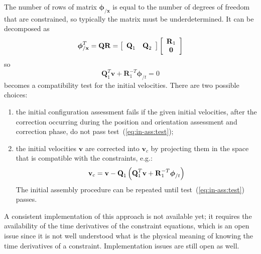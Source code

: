 \documentclass[10pt,dvips,fleqn,subeqn]{report}
\newcommand{\T}[1]{\bm{\mathbf{#1}}}
\begin{document}
The number of rows of matrix $\T{\phi}_{/\T{x}}$ is equal to the number 
of degrees of freedom that are constrained, so typically the matrix 
must be underdetermined.
It can be decomposed as
\begin{equation}
	\T{\phi}_{/\T{x}}^T = \T{Q} \T{R}
		= \sqbr{\matr{cc}{\T{Q}_1 & \T{Q}_2}}\sqbr{\cvvect{\T{R}_1 \\ \T{0}}}
\end{equation}
so
\begin{equation}
	\T{Q}_1^T \T{v} + \T{R}_1^{-T} \T{\phi}_{/t} = 0
	\label{eq:in-ass:test}
\end{equation}
becomes a compatibility test for the initial velocities.
There are two possible choices:
\begin{enumerate}
\item the initial configuration assessment fails if the given 
initial velocities, after the correction occurring during the position 
and orientation assessment and correction phase, do not pass 
test~(\ref{eq:in-ass:test});
\item the initial velocities $\T{v}$ are corrected into $\T{v}_c$ 
by projecting them in the space that is compatible with the constraints, 
e.g.:
\begin{equation}
	\T{v}_c = \T{v} - \T{Q}_1 \plbr{\T{Q}_1^T \T{v} + \T{R}_1^{-T}\T{\phi}_{/t}}
\end{equation}
The initial assembly procedure can be repeated until 
test~(\ref{eq:in-ass:test}) passes.
\end{enumerate}
A consistent implementation of this approach is not available yet;
it requires the availability of the time derivatives 
of the constraint equations, which is an open issue since it is not
well understood what is the physical meaning of knowing 
the time derivatives of a constraint.
Implementation issues are still open as well.
\end{document}
